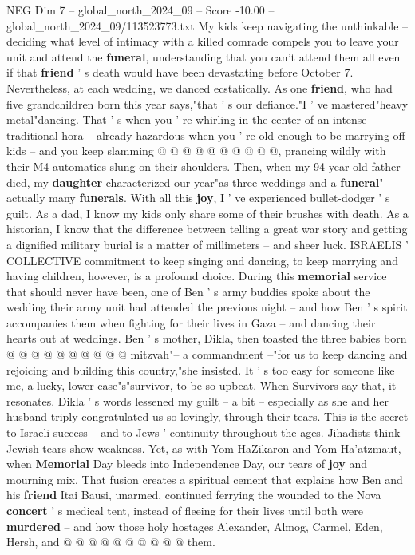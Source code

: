 \begin{textsample}{NEG Dim 7 – global\_north\_2024\_09 – Score -10.00 – global\_north\_2024\_09/113523773.txt}
My kids keep navigating the unthinkable -- deciding what level of intimacy with a killed comrade compels you to leave your unit and attend the \textbf{funeral}, understanding that you can't attend them all even if that \textbf{friend} ' s death would have been devastating before October 7.
Nevertheless, at each wedding, we danced ecstatically.
As one \textbf{friend}, who had five grandchildren born this year says,"that ' s our defiance."I ' ve mastered"heavy metal"dancing.
That ' s when you ' re whirling in the center of an intense traditional hora -- already hazardous when you ' re old enough to be marrying off kids -- and you keep slamming @ @ @ @ @ @ @ @ @ @, prancing wildly with their M4 automatics slung on their shoulders.
Then, when my 94-year-old father died, my \textbf{daughter} characterized our year"as three weddings and a \textbf{funeral}"-- actually many \textbf{funerals}.
With all this \textbf{joy}, I ' ve experienced bullet-dodger ' s guilt.
As a dad, I know my kids only share some of their brushes with death.
As a historian, I know that the difference between telling a great war story and getting a dignified military burial is a matter of millimeters -- and sheer luck.
ISRAELIS ' COLLECTIVE commitment to keep singing and dancing, to keep marrying and having children, however, is a profound choice.
During this \textbf{memorial} service that should never have been, one of Ben ' s army buddies spoke about the wedding their army unit had attended the previous night -- and how Ben ' s spirit accompanies them when fighting for their lives in Gaza -- and dancing their hearts out at weddings.
Ben ' s mother, Dikla, then toasted the three babies born @ @ @ @ @ @ @ @ @ @ mitzvah"-- a commandment --"for us to keep dancing and rejoicing and building this country,"she insisted.
It ' s too easy for someone like me, a lucky, lower-case"s"survivor, to be so upbeat.
When Survivors say that, it resonates.
Dikla ' s words lessened my guilt -- a bit -- especially as she and her husband triply congratulated us so lovingly, through their tears.
This is the secret to Israeli success -- and to Jews ' continuity throughout the ages.
Jihadists think Jewish tears show weakness.
Yet, as with Yom HaZikaron and Yom Ha'atzmaut, when \textbf{Memorial} Day bleeds into Independence Day, our tears of \textbf{joy} and mourning mix.
That fusion creates a spiritual cement that explains how Ben and his \textbf{friend} Itai Bausi, unarmed, continued ferrying the wounded to the Nova \textbf{concert} ' s medical tent, instead of fleeing for their lives until both were \textbf{murdered} -- and how those holy hostages Alexander, Almog, Carmel, Eden, Hersh, and @ @ @ @ @ @ @ @ @ @ them.

\end{textsample}
